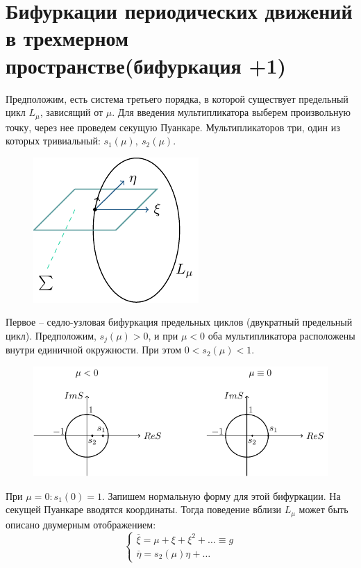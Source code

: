 \section{Бифуркации периодических движений в трехмерном пространстве(бифуркация +1)}
Предположим, есть система третьего порядка, в которой существует предельный цикл $L_{\mu}$, зависящий от $\mu$. Для введения мультипликатора выберем произвольную точку, через нее проведем секущую Пуанкаре. Мультипликаторов три, один из которых тривиальный: $s_1(\mu),~s_2(\mu)$.
\begin{figure} 
	\vspace{0.1em}
	\centering
	\includegraphics[scale=1]{fig/fig62.pdf}
	\vspace{-0.25em}
\end{figure}

Первое -- седло-узловая бифуркация предельных циклов (двукратный предельный цикл). Предположим, $s_j(\mu)>0$, и при $\mu<0$ оба мультипликатора расположены внутри единичной окружности. При этом $0<s_2(\mu)<1$.
\begin{figure}[H]
	\centering
	\includegraphics[width=1\linewidth]{fig/fig63.pdf}   
\end{figure}

При $\mu=0: s_1(0)= 1$. Запишем нормальную форму для этой бифуркации. На секущей Пуанкаре вводятся координаты. Тогда поведение вблизи $L_{\mu}$ может быть описано двумерным отображением:
\begin{equation}
	\begin{cases}
		\stackrel{\_}{\xi}= \mu+\xi+\xi^2+\dots \equiv g\\
		\stackrel{\_}{\eta}= s_2(\mu)\eta+\dots
	\end{cases}
	\label{eq:109}	
\end{equation}

